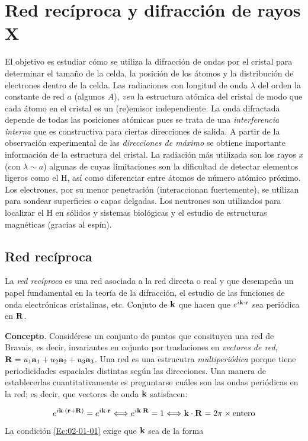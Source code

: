 \chapter{Red recíproca y difracción de rayos X} \label{Ch:02}

El objetivo es estudiar cómo se utiliza la difracción de ondas por el cristal para determinar el tamaño de la celda, la posición de los átomos y la distribución de electrones dentro de la celda. Las radiaciones con longitud de onda $\lambda$ del orden la constante de red $a$   (algunos $ A$), {\it ven} la estructura atómica del cristal de modo que cada átomo en el cristal es un (re)emisor independiente. La onda difractada depende de todas las posiciones atómicas pues se trata de una \textit{interferencia interna} que es constructiva para ciertas direcciones de salida. A partir de la observación experimental de las \textit{direcciones de máximo} se obtiene importante información de la estructura del cristal. La radiación más utilizada son los rayos {\it x} (con $\lambda \sim a$) algunas de cuyas limitaciones son la dificultad de detectar elementos ligeros como el H, así como diferenciar entre átomos de número atómico próximo. Los electrones, por su menor penetración (interaccionan fuertemente), se utilizan para sondear superficies o capas delgadas. Los neutrones son utilizados para localizar el H en sólidos y sistemas biológicas y el estudio de estructuras magnéticas (gracias al espín).

\section{Red recíproca}

La \textit{red recíproca} es una red asociada a la red directa o real y que desempeña un papel fundamental en la teoría de la difracción, el estudio de las funciones de onda electrónicas cristalinas, etc.  Conjuto de $\mathbf{k}$ que hacen que $e^{i\mathbf{k} \cdot \mathbf{r}}$ sea periódica en $\mathbf{R}$. 

\textbf{Concepto}. Considérese un conjunto de puntos que consituyen una red de Bravais, es decir, invariantes en cojunto por traslaciones en \textit{vectores de red}, $\mathbf{R} = u_1 \mathbf{a}_1 + u_2 \mathbf{a}_2 + u_3 \mathbf{a}_3$. Una red es una estrucutra \textit{multiperiódica} porque tiene periodicidades espaciales distintas según las direcciones. Una manera de establecerlas cuantitativamente es preguntarse cuáles son las ondas periódicas en la red; es decir, que vectores de onda $\mathbf{k}$ satisfacen:

\begin{equation}
    e^{i\mathbf{k} \cdot (\mathbf{r} + \mathbf{R})} = e^{i \mathbf{k} \cdot \mathbf{r}} \Longleftrightarrow  e^{i \mathbf{k} \cdot \mathbf{R}} = 1 \Longleftrightarrow \mathbf{k} \cdot \mathbf{R} = 2\pi \times \text{entero} \label{Ec:02-01-01}
\end{equation}
La condición \ref{Ec:02-01-01} exige que $\mathbf{k}$ sea de la forma 

